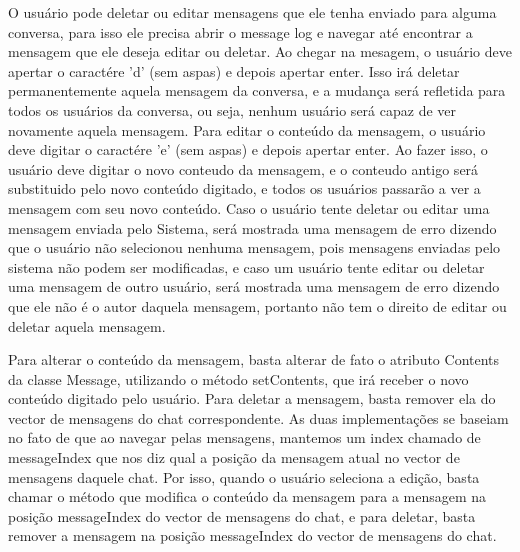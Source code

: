 \documentclass[../main.tex]{subfiles}
\begin{document}
O usuário pode deletar ou editar mensagens que ele tenha enviado para alguma conversa, para isso ele precisa abrir o message log e navegar até encontrar a mensagem que ele deseja editar ou deletar. Ao chegar na mesagem, o usuário deve apertar o caractére 'd' (sem aspas) e depois apertar enter. Isso irá deletar permanentemente aquela mensagem da conversa, e a mudança será refletida para todos os usuários da conversa, ou seja, nenhum usuário será capaz de ver novamente aquela mensagem. Para editar o conteúdo da mensagem, o usuário deve digitar o caractére 'e' (sem aspas) e depois apertar enter. Ao fazer isso, o usuário deve digitar o novo conteudo da mensagem, e o conteudo antigo será substituido pelo novo conteúdo digitado, e todos os usuários passarão a ver a mensagem com seu novo conteúdo. Caso o usuário tente deletar ou editar uma mensagem enviada pelo Sistema, será mostrada uma mensagem de erro dizendo que o usuário não selecionou nenhuma mensagem, pois mensagens enviadas pelo sistema não podem ser modificadas, e caso um usuário tente editar ou deletar uma mensagem de outro usuário, será mostrada uma mensagem de erro dizendo que ele não é o autor daquela mensagem, portanto não tem o direito de editar ou deletar aquela mensagem.

Para alterar o conteúdo da mensagem, basta alterar de fato o atributo Contents da classe Message, utilizando o método setContents, que irá receber o novo conteúdo digitado pelo usuário. Para deletar a mensagem, basta remover ela do vector de mensagens do chat correspondente. As duas implementações se baseiam no fato de que ao navegar pelas mensagens, mantemos um index chamado de messageIndex que nos diz qual a posição da mensagem atual no vector de mensagens daquele chat. Por isso, quando o usuário seleciona a edição, basta chamar o método que modifica o conteúdo da mensagem para a mensagem na posição messageIndex do vector de mensagens do chat, e para deletar, basta remover a mensagem na posição messageIndex do vector de mensagens do chat. 
\end{document}
